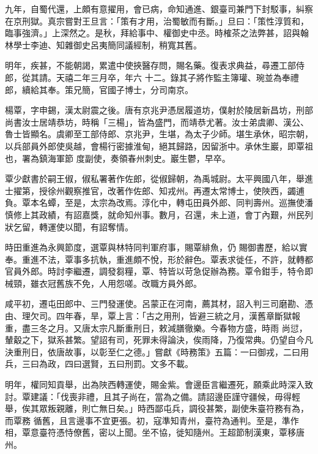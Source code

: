 \begin{pinyinscope}
 九年，自蜀代還，上頗有意擢用，會已病，命知通進、銀臺司兼門下封駁事，糾察在京刑獄。真宗嘗對王旦言：「策有才用，治蜀敏而有斷。」旦曰：「策性淳質和，臨事強濟。」上深然之。是秋，拜給事中、權御史中丞。時榷茶之法弊甚，詔與翰林學士李迪、知雜御史呂夷簡同議經制，稍寬其舊。



 明年，疾甚，不能朝謁，累遣中使挾醫存問，賜名藥。復表求典益，尋遷工部侍郎，從其請。天禧二年三月卒，年六
 十二。錄其子將作監主簿瓘、琬並為奉禮郎，續給其奉。策兄簡，官國子博士，分司南京。



 楊覃，字申錫，漢太尉震之後。唐有京兆尹憑居履道坊，僕射於陵居新昌坊，刑部尚書汝士居靖恭坊，時稱「三楊」，皆為盛門，而靖恭尤著。汝士弟虞卿、漢公、魯士皆顯名。虞卿至工部侍郎、京兆尹，生堪，為太子少師。堪生承休，昭宗朝，以兵部員外郎使吳越，會楊行密據淮甸，絕其歸路，因留浙中。承休生巖，即覃祖也，署為鎮海軍節
 度副使，奏領春州刺史。巖生鬱，早卒。



 覃少獻書於嗣王俶，俶私署著作佐郎，從俶歸朝，為禹城尉。太平興國八年，舉進士擢第，授徐州觀察推官，改著作佐郎、知戎州。再遷太常博士，使陜西，蠲逋負。覃本名蟫，至是，太宗為改焉。淳化中，轉屯田員外郎、同判壽州。巡撫使潘慎修上其政績，有詔嘉獎，就命知州事。數月，召還，未上道，會丁內艱，州民列狀乞留，轉運使以聞，有詔奪情。



 時田重進為永興節度，選覃與林特同判軍府事，賜覃緋魚，仍
 賜御書歷，給以實奉。重進不法，覃事多抗執，重進頗不悅，形於辭色。覃表求徙任，不許，就轉都官員外郎。時討李繼遷，調發芻糧，覃、特皆以苛急促辦為務。覃令鉗手，特令即械頸，雖衣冠舊族不免，人用怨嗟。改職方員外郎。



 咸平初，遷屯田郎中、三門發運使。呂蒙正在河南，薦其材，詔入判三司磨勘、憑由、理欠司。四年春，旱，覃上言：「古之用刑，皆避三統之月，漢舊章斷獄報重，盡三冬之月。又唐太宗凡斷重刑日，敕減膳徹樂。今春物方盛，時雨
 尚愆，輦觳之下，獄系甚繁。望詔有司，死罪未得論決，俟雨降，乃復常典。仍望自今凡決重刑日，依唐故事，以彰至仁之德。」嘗獻《時務策》五篇：一曰御戎，二曰用兵，三曰為政，四曰選賢，五曰刑罰。文多不載。



 明年，權同知貢舉，出為陜西轉運使，賜金紫。會邊臣言繼遷死，願乘此時深入致討。覃建議：「伐喪非禮，且其子尚在，當為之備。請詔邊臣謹守疆候，毋得輕舉，俟其眾叛親離，則亡無日矣。」時西鄙屯兵，調役甚繁，副使朱臺符務有為，而覃務
 循舊，且言邊事不宜更張。初，寇準知青州，臺符為通判。至是，準作相，覃意臺符憑恃僚舊，密以上聞。坐不協，徙知隨州。王超節制漢東，覃移唐州。




\end{pinyinscope}
